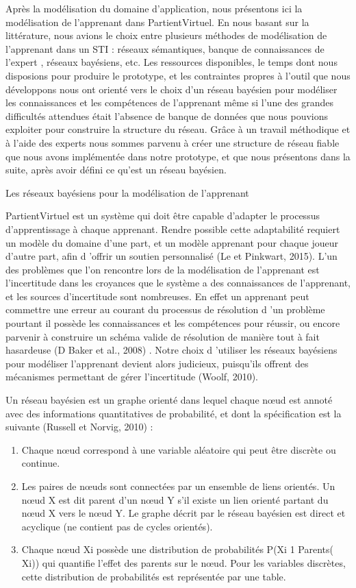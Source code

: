 Après la modélisation du domaine d'application, nous présentons ici la modélisation de l'apprenant dans PartientVirtuel.
 En nous basant sur la littérature, nous avions le choix entre plusieurs méthodes de modélisation de l'apprenant dans un STI : réseaux sémantiques, banque de connaissances de l'expert , réseaux bayésiens, etc. Les ressources disponibles, le temps dont nous disposions pour produire le prototype, et les contraintes propres à l'outil que nous développons nous ont orienté vers le choix d'un réseau bayésien pour modéliser les connaissances et les compétences de l'apprenant même si l'une des grandes difficultés attendues était l'absence de banque de données que nous pouvions exploiter pour construire la structure du réseau. Grâce à un travail méthodique et à l'aide des experts nous sommes parvenu à créer une structure de réseau fiable que nous avons implémentée dans notre prototype, et que nous présentons dans la suite, après avoir défini ce qu'est un réseau bayésien.
 
 
 
 Les réseaux bayésiens pour la modélisation de l'apprenant

PartientVirtuel est un système qui doit être capable d'adapter le processus d'apprentissage à chaque apprenant. Rendre possible cette adaptabilité requiert un modèle du domaine d'une part, et un modèle apprenant pour chaque joueur d'autre part, afin d 'offrir un soutien personnalisé (Le et Pinkwart, 2015). L'un des problèmes que l'on rencontre lors de la modélisation de l'apprenant est l'incertitude dans les croyances que le système a des connaissances de l'apprenant, et les sources d'incertitude sont nombreuses. En effet un apprenant peut commettre une erreur au courant du processus de résolution d 'un problème pourtant il possède les connaissances et les compétences pour réussir, ou encore parvenir à construire un schéma valide de résolution de manière tout à fait hasardeuse (D Baker et al., 2008) . Notre choix d 'utiliser les réseaux bayésiens pour modéliser l'apprenant devient alors judicieux, puisqu'ils offrent des mécanismes permettant de gérer l'incertitude (Woolf, 2010). 

Un réseau bayésien est un graphe orienté dans lequel chaque nœud est annoté avec des informations quantitatives de probabilité, et dont la spécification est la suivante (Russell et Norvig, 2010) :
\begin{enumerate}
\item Chaque nœud correspond à une variable aléatoire qui peut être discrète ou continue.
\item  Les paires de nœuds sont connectées par un ensemble de liens orientés. Un nœud X est dit parent d'un nœud Y s'il existe un lien orienté partant du nœud X vers le nœud Y. Le graphe décrit par le réseau bayésien est direct et acyclique (ne contient pas de cycles orientés).
\item  Chaque nœud Xi possède une distribution de probabilités P(Xi 1 Parents( Xi)) qui quantifie l'effet des parents sur le nœud. Pour les variables discrètes, cette distribution de probabilités est représentée par une table. 
\end{enumerate}
 

